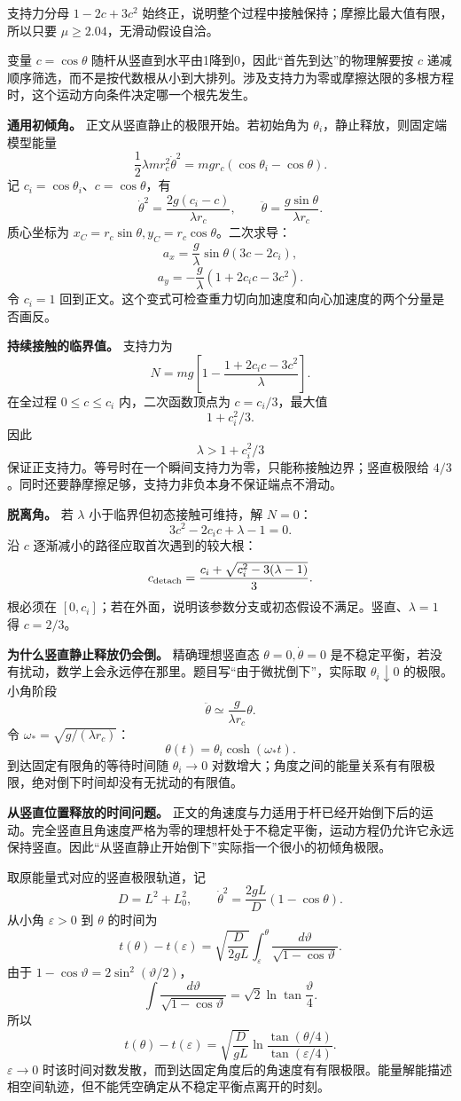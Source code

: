 \documentclass[12pt,a4paper,UTF8]{ctexart}
\begin{document}
支持力分母 \(1-2c+3c^2\)
始终正，说明整个过程中接触保持；摩擦比最大值有限，所以只要
\(\mu\ge2.04\)，无滑动假设自洽。

变量 \(c=\cos\theta\)
随杆从竖直到水平由1降到0，因此``首先到达''的物理解要按 \(c\)
递减顺序筛选，而不是按代数根从小到大排列。涉及支持力为零或摩擦达限的多根方程时，这个运动方向条件决定哪一个根先发生。

\textbf{通用初倾角。} 正文从竖直静止的极限开始。若初始角为
\(\theta_i\)，静止释放，则固定端模型能量 \[
\frac12\lambda mr_c^2\dot\theta^2
=mgr_c(\cos\theta_i-\cos\theta).
\] 记 \(c_i=\cos\theta_i\)、\(c=\cos\theta\)，有 \[
\dot\theta^2=\frac{2g(c_i-c)}{\lambda r_c},
\qquad
\ddot\theta=\frac{g\sin\theta}{\lambda r_c}.
\] 质心坐标为 \(x_C=r_c\sin\theta,y_C=r_c\cos\theta\)。二次求导： \[
a_x=\frac g\lambda\sin\theta(3c-2c_i),
\] \[
a_y=-\frac g\lambda(1+2c_ic-3c^2).
\] 令 \(c_i=1\)
回到正文。这个变式可检查重力切向加速度和向心加速度的两个分量是否画反。

\textbf{持续接触的临界值。} 支持力为 \[
N=mg\left[1-\frac{1+2c_ic-3c^2}{\lambda}\right].
\] 在全过程 \(0\le c\le c_i\) 内，二次函数顶点为 \(c=c_i/3\)，最大值 \[
1+c_i^2/3.
\] 因此 \[
\boxed{\lambda>1+c_i^2/3}
\] 保证正支持力。等号时在一个瞬间支持力为零，只能称接触边界；竖直极限给
\(4/3\)。同时还要静摩擦足够，支持力非负本身不保证端点不滑动。

\textbf{脱离角。} 若 \(\lambda\) 小于临界但初态接触可维持，解 \(N=0\)：
\[
3c^2-2c_ic+\lambda-1=0.
\] 沿 \(c\) 逐渐减小的路径应取首次遇到的较大根： \[
c_{\rm detach}=\frac{c_i+\sqrt{c_i^2-3(\lambda-1)}}3.
\] 根必须在
\([0,c_i]\)；若在外面，说明该参数分支或初态假设不满足。竖直、\(\lambda=1\)
得 \(c=2/3\)。

\textbf{为什么竖直静止释放仍会倒。} 精确理想竖直态
\(\theta=0,\dot\theta=0\)
是不稳定平衡，若没有扰动，数学上会永远停在那里。题目写``由于微扰倒下''，实际取
\(\theta_i\downarrow0\) 的极限。小角阶段 \[
\ddot\theta\simeq\frac g{\lambda r_c}\theta.
\] 令 \(\omega_*=\sqrt{g/(\lambda r_c)}\)： \[
\theta(t)=\theta_i\cosh(\omega_*t).
\] 到达固定有限角的等待时间随 \(\theta_i\to0\)
对数增大；角度之间的能量关系有有限极限，绝对倒下时间却没有无扰动的有限值。

\textbf{从竖直位置释放的时间问题。}
正文的角速度与力适用于杆已经开始倒下后的运动。完全竖直且角速度严格为零的理想杆处于不稳定平衡，运动方程仍允许它永远保持竖直。因此``从竖直静止开始倒下''实际指一个很小的初倾角极限。

取原能量式对应的竖直极限轨道，记 \[
D=L^2+L_0^2,\qquad
\dot\theta^2=\frac{2gL}{D}(1-\cos\theta).
\] 从小角 \(\varepsilon>0\) 到 \(\theta\) 的时间为 \[
t(\theta)-t(\varepsilon)
=\sqrt{\frac{D}{2gL}}\int_\varepsilon^\theta
\frac{d\vartheta}{\sqrt{1-\cos\vartheta}}.
\] 由于 \(1-\cos\vartheta=2\sin^2(\vartheta/2)\)， \[
\int\frac{d\vartheta}{\sqrt{1-\cos\vartheta}}
=\sqrt2\ln\tan\frac{\vartheta}{4}.
\] 所以 \[
\boxed{t(\theta)-t(\varepsilon)
=\sqrt{\frac D{gL}}
\ln\frac{\tan(\theta/4)}{\tan(\varepsilon/4)}}.
\] \(\varepsilon\to0\)
时该时间对数发散，而到达固定角度后的角速度有有限极限。能量解能描述相空间轨迹，但不能凭空确定从不稳定平衡点离开的时刻。
\end{document}
